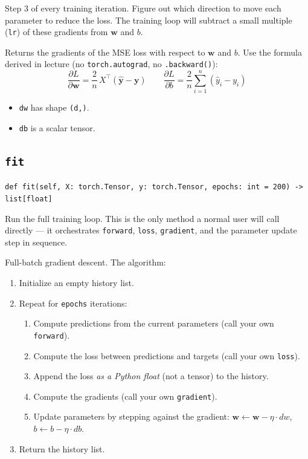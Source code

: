\documentclass[11pt]{article}
\newcommand{\code}[1]{\texttt{\small #1}}
\newcommand{\vw}{\mathbf{w}}
\newcommand{\vy}{\mathbf{y}}
\newcommand{\vyhat}{\hat{\mathbf{y}}}
\begin{document}
\medskip\noindent
Step 3 of every training iteration. Figure out which direction
to move each parameter to reduce the loss. The training loop will subtract a
small multiple (\code{lr}) of these gradients from $\vw$ and $b$.

\medskip\noindent
Returns the gradients of the MSE loss with respect to $\vw$ and $b$. Use the
formula derived in lecture (no \code{torch.autograd}, no \code{.backward()}):
\[
    \frac{\partial L}{\partial \vw} = \frac{2}{n}\, X^{\top} (\vyhat - \vy)
    \qquad
    \frac{\partial L}{\partial b} = \frac{2}{n} \sum_{i=1}^{n} (\hat{y}_i - y_i)
\]

\begin{itemize}
    \item \code{dw} has shape \code{(d,)}.
    \item \code{db} is a scalar tensor.
\end{itemize}

\subsection{\texttt{fit}}

\noindent
\code{def fit(self, X: torch.Tensor, y: torch.Tensor, epochs: int = 200) -> list[float]}

\medskip\noindent
Run the full training loop. This is the only method a normal
user will call directly --- it orchestrates \code{forward}, \code{loss},
\code{gradient}, and the parameter update step in sequence.

\medskip\noindent
Full-batch gradient descent. The algorithm:

\begin{enumerate}
    \item Initialize an empty history list.
    \item Repeat for \code{epochs} iterations:
    \begin{enumerate}
        \item Compute predictions from the current parameters (call your own
              \code{forward}).
        \item Compute the loss between predictions and targets (call your own
              \code{loss}).
        \item Append the loss \emph{as a Python float} (not a tensor) to the
              history.
        \item Compute the gradients (call your own \code{gradient}).
        \item Update parameters by stepping against the gradient:
              $\vw \leftarrow \vw - \eta \cdot dw$,\quad
              $b \leftarrow b - \eta \cdot db$.
    \end{enumerate}
    \item Return the history list.
\end{enumerate}
\end{document}
